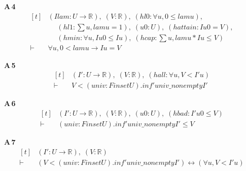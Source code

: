 \noindent\textbf{A\,4}\quad{}
{\footnotesize\[ \begin{aligned}[t]
&(\mathit{I} \mathit{lam} : \mathit{U} \to \mathbb{R} ),\; (\mathit{V} : \mathbb{R} ),\; (\mathit{hl0} : \forall \mathit{u}, 0 \leq \mathit{lam} \mathit{u}),\\
&\quad \; (\mathit{hl1} : \textstyle\sum \mathit{u}, \mathit{lam} \mathit{u} = 1),\; (\mathit{u0} : \mathit{U}),\; (\mathit{hattain} : \mathit{I} \mathit{u0} = \mathit{V}),\\
&\quad \; (\mathit{hmin} : \forall \mathit{u}, \mathit{I} \mathit{u0} \leq \mathit{I} \mathit{u}),\; (\mathit{hcap} : \textstyle\sum \mathit{u}, \mathit{lam} \mathit{u} * \mathit{I} \mathit{u} \leq \mathit{V})\\
\vdash\;&\forall \mathit{u}, 0 < \mathit{lam} \mathit{u} \to \mathit{I} \mathit{u} = \mathit{V}
\end{aligned} \]}

\noindent\textbf{A\,5}\quad{}
{\footnotesize\[ \begin{aligned}[t]
&(\mathit{I'} : \mathit{U} \to \mathbb{R} ),\; (\mathit{V} : \mathbb{R} ),\; (\mathit{hall} : \forall \mathit{u}, \mathit{V} < \mathit{I'} \mathit{u})\\
\vdash\;&\mathit{V} < (\mathit{univ} : \mathit{Finset} \mathit{U}).\mathit{inf'} \mathit{univ\_nonempty} \mathit{I'}
\end{aligned} \]}

\noindent\textbf{A\,6}\quad{}
{\footnotesize\[ \begin{aligned}[t]
&(\mathit{I'} : \mathit{U} \to \mathbb{R} ),\; (\mathit{V} : \mathbb{R} ),\; (\mathit{u0} : \mathit{U}),\; (\mathit{hbad} : \mathit{I'} \mathit{u0} \leq \mathit{V})\\
\vdash\;&(\mathit{univ} : \mathit{Finset} \mathit{U}).\mathit{inf'} \mathit{univ\_nonempty} \mathit{I'} \leq \mathit{V}
\end{aligned} \]}

\noindent\textbf{A\,7}\quad{}
{\footnotesize\[ \begin{aligned}[t]
&(\mathit{I'} : \mathit{U} \to \mathbb{R} ),\; (\mathit{V} : \mathbb{R} )\\
\vdash\;&(\mathit{V} < (\mathit{univ} : \mathit{Finset} \mathit{U}).\mathit{inf'} \mathit{univ\_nonempty} \mathit{I'}) \leftrightarrow (\forall \mathit{u}, \mathit{V} < \mathit{I'} \mathit{u})
\end{aligned} \]}

